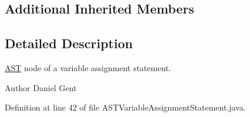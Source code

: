 \subsection*{Additional Inherited Members}


\subsection{Detailed Description}
\hyperlink{classorg_1_1tzi_1_1use_1_1parser_1_1_a_s_t}{A\-S\-T} node of a variable assignment statement. \begin{DoxyAuthor}{Author}
Daniel Gent 
\end{DoxyAuthor}


Definition at line 42 of file A\-S\-T\-Variable\-Assignment\-Statement.\-java.



